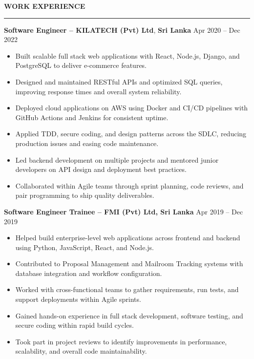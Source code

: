 \documentclass[10pt,letterpaper]{article}
\begin{document}
\textbf{WORK EXPERIENCE}\\[-8pt]
\noindent\rule{\textwidth}{1pt}

\vspace{-2pt}

\textbf{Software Engineer -- KILATECH (Pvt) Ltd}, \textbf{Sri Lanka} \hfill Apr 2020 -- Dec 2022

\vspace{-1pt}

\begin{itemize}
\item Built scalable full stack web applications with React, Node.js, Django, and PostgreSQL to deliver e-commerce features.
\item Designed and maintained RESTful APIs and optimized SQL queries, improving response times and overall system reliability.
\item Deployed cloud applications on AWS using Docker and CI/CD pipelines with GitHub Actions and Jenkins for consistent uptime.
\item Applied TDD, secure coding, and design patterns across the SDLC, reducing production issues and easing code maintenance.
\item Led backend development on multiple projects and mentored junior developers on API design and deployment best practices.
\item Collaborated within Agile teams through sprint planning, code reviews, and pair programming to ship quality deliverables.
\end{itemize}

\textbf{Software Engineer Trainee -- FMI (Pvt) Ltd, Sri Lanka} \hfill Apr 2019 -- Dec 2019

\vspace{-1pt}

\begin{itemize}
\item Helped build enterprise-level web applications across frontend and backend using Python, JavaScript, React, and Node.js.
\item Contributed to Proposal Management and Mailroom Tracking systems with database integration and workflow configuration.
\item Worked with cross-functional teams to gather requirements, run tests, and support deployments within Agile sprints.
\item Gained hands-on experience in full stack development, software testing, and secure coding within rapid build cycles.
\item Took part in project reviews to identify improvements in performance, scalability, and overall code maintainability.
\end{itemize}
\end{document}
